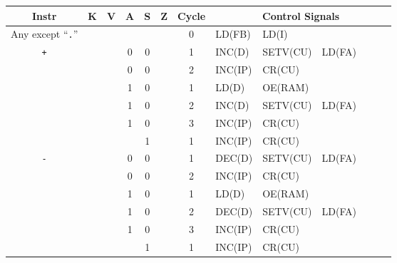 

  \begin{longtable}[c] {c|ccccc|c|llllll}
                     Instr          & K & V & A & S     & Z    & Cycle & \multicolumn{6}{c}{Control Signals}                      \\ \hline
    \rowcolor{White} Any except ``\texttt{.}''          &   &   &       &      &      & 0   & LD(FB)          & LD(I)         &        &        &        \\ \hline
    \rowcolor{Gray}  \texttt{+}   &   &   & 0 & 0     &      & 1     & INC(D)   & SETV(CU) & LD(FA)  &        &        &        \\
    \rowcolor{Gray}               &   &   & 0 & 0     &      & 2     & INC(IP)  & CR(CU)   &         &        &        &        \\    
    \rowcolor{White}              &   &   & 1 & 0     &      & 1     & LD(D)    & OE(RAM)  &         &        &        &        \\
    \rowcolor{White}              &   &   & 1 & 0     &      & 2     & INC(D)   & SETV(CU) & LD(FA)  &        &        &        \\
    \rowcolor{White}              &   &   & 1 & 0     &      & 3     & INC(IP)  & CR(CU)   &         &        &        &        \\
    \rowcolor{Gray}               &   &   &   & 1     &      & 1     & INC(IP)  & CR(CU)   &         &        &        &        \\ \hline
    
    \rowcolor{Gray}  \texttt{-}   &   &   & 0 & 0     &      & 1     & DEC(D)   & SETV(CU) & LD(FA)  &        &        &        \\
    \rowcolor{Gray}               &   &   & 0 & 0     &      & 2     & INC(IP)  & CR(CU)   &         &        &        &        \\    
    \rowcolor{White}              &   &   & 1 & 0     &      & 1     & LD(D)    & OE(RAM)  &         &        &        &        \\
    \rowcolor{White}              &   &   & 1 & 0     &      & 2     & DEC(D)   & SETV(CU) & LD(FA)  &        &        &        \\
    \rowcolor{White}              &   &   & 1 & 0     &      & 3     & INC(IP)  & CR(CU)   &         &        &        &        \\
    \rowcolor{Gray}               &   &   &   & 1     &      & 1     & INC(IP)  & CR(CU)   &         &        &        &        \\ \hline


\end{longtable}
